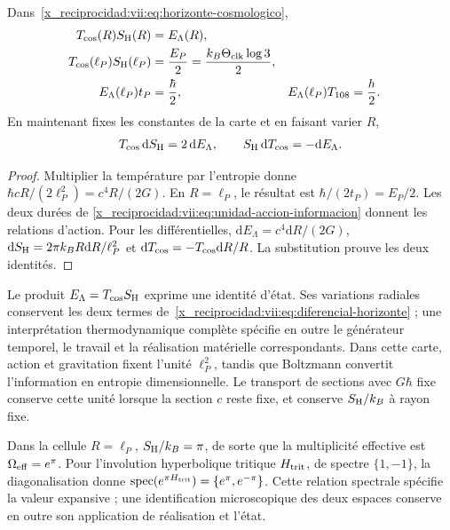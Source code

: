 \begin{theorem}
\label{x_reciprocidad:vii:thm:celda-media-accion}
Dans~\eqref{x_reciprocidad:vii:eq:horizonte-cosmologico},
\begin{align}
 T_{\rm cos}(R)S_{\rm H}(R)&=E_\Lambda(R),\\
 T_{\rm cos}(\ell_P)S_{\rm H}(\ell_P)
 &=\frac{E_P}{2}=\frac{k_B\Theta_{\rm clk}\log3}{2},\\
 E_\Lambda(\ell_P)t_P&=\frac{\hbar}{2},&
 E_\Lambda(\ell_P)T_{108}&=\frac h2.
 \label{x_reciprocidad:vii:eq:media-accion-horizonte}
\end{align}
En maintenant fixes les constantes de la carte et en faisant varier \(R\),
\begin{equation}
 T_{\rm cos}\,\mathrm dS_{\rm H}=2\,\mathrm dE_\Lambda,
 \qquad S_{\rm H}\,\mathrm dT_{\rm cos}=-\mathrm dE_\Lambda.
 \label{x_reciprocidad:vii:eq:diferencial-horizonte}
\end{equation}
\end{theorem}
\begin{proof}
Multiplier la température par l'entropie donne
\(\hbar cR/(2\ell_P^2)=c^4R/(2G)\).
En \(R=\ell_P\), le résultat est
\(\hbar/(2t_P)=E_P/2\). Les deux durées de
\eqref{x_reciprocidad:vii:eq:unidad-accion-informacion} donnent les relations d'action.
Pour les différentielles,
\(\mathrm dE_\Lambda=c^4\mathrm dR/(2G)\),
\(\mathrm dS_{\rm H}=2\pi k_BR\mathrm dR/\ell_P^2\) et
\(\mathrm dT_{\rm cos}=-T_{\rm cos}\mathrm dR/R\).
La substitution prouve les deux identités.
\end{proof}

Le produit \(E_\Lambda=T_{\rm cos}S_{\rm H}\) exprime une identité d'état. Ses variations radiales conservent les deux termes de~\eqref{x_reciprocidad:vii:eq:diferencial-horizonte} ; une interprétation thermodynamique complète spécifie en outre le générateur temporel, le travail et la réalisation matérielle correspondants. Dans cette carte, action et gravitation fixent l'unité \(\ell_P^2\), tandis que Boltzmann convertit l'information en entropie dimensionnelle. Le transport de sections avec \(G\hbar\) fixe conserve cette unité lorsque la section \(c\) reste fixe, et conserve \(S_{\rm H}/k_B\) à rayon fixe.

Dans la cellule \(R=\ell_P\), \(S_{\rm H}/k_B=\pi\), de sorte que
la multiplicité effective est \(\Omega_{\rm eff}=e^\pi\).
Pour l'involution hyperbolique tritique \(H_{\rm trit}\), de spectre
\(\{1,-1\}\), la diagonalisation donne
\(\operatorname{spec}(e^{\pi H_{\rm trit}})=\{e^\pi,e^{-\pi}\}\).
Cette relation spectrale spécifie la valeur expansive ; une identification
microscopique des deux espaces conserve en outre son application de
réalisation et l'état.

